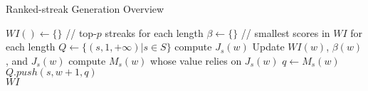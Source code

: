 \begin{algorithm}[t]
\caption{Ranked-streak Generation Overview}
\label{algo:prune_overview}
\begin{algorithmic}[1]
\State $WI() \gets \{\}$ // top-$p$ streaks for each length
\State $\beta \gets \{\}$ // smallest scores in $WI$ for each length
\State $Q \gets \{(s,1,+\infty) | s \in S\}$
 \label{code:subj_selection}
		\State compute $J_s(w)$	\label{code:v_prune_start}	
		 \label{code:v_prune_end}
			\label{code:e_compute_start}		
				\State Update $WI(w)$, $\beta(w)$, and $J_s(w)$
			\EndFor	\label{code:e_compute_end}
		\EndIf
		\State compute $M_s(w)$ whose value relies on $J_s(w)$\label{code:u_prune_start}
		 \label{code:u_prune_end}
			\State $q \leftarrow M_s(w)$
			\State $Q.push(s,w+1,q)$ \label{code:q_insert}
		\EndIf
\EndWhile \\
\Return $WI$
\end{algorithmic}
\end{algorithm}




